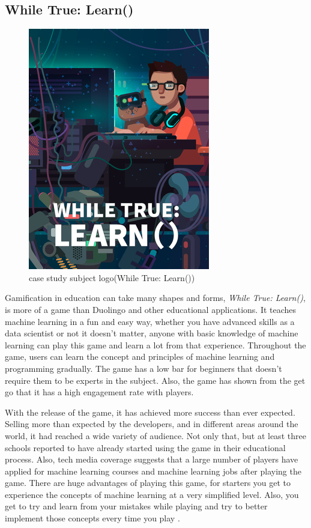 \documentclass[../main.tex]{subfiles}
\begin{document}
\subsection{While True: Learn()}

\begin{figure}[h!]
\centering
\includegraphics[scale=0.3]{images/chapter2/image12.jpg}
\caption{case study subject logo(While True: Learn())}
\label{ case study subject logo (While True: Learn())}
\end{figure}

Gamification in education can take many shapes and forms, \textit{While True: Learn()}, is more of a game than Duolingo and other educational applications. It teaches machine learning in a fun and easy way, whether you have advanced skills as a data scientist or not it doesn’t matter, anyone with basic knowledge of machine learning can play this game and learn a lot from that experience.  Throughout the game, users can learn the concept and principles of machine learning and programming gradually. The game has a low bar for beginners that doesn’t require them to be experts in the subject. Also, the game has shown from the get go that it has a high engagement rate with players.

With the release of the game, it has achieved more success than ever expected. Selling more than expected by the developers, and in different areas around the world, it had reached a wide variety of audience. Not only that, but at least three schools reported to have already started using the game in their educational process. Also, tech media coverage suggests that a large number of players have applied for machine learning courses and machine learning jobs after playing the game. There are huge advantages of playing this game, for starters you get to experience the concepts of machine learning at a very simplified level. Also, you get to try and learn from your mistakes while playing and try to better implement those concepts every time you play \cite{30}. 
\end{document}
